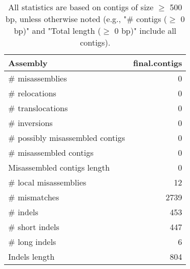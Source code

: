\documentclass[12pt,a4paper]{article}
\begin{document}
\begin{table}[ht]
\begin{center}
\caption{All statistics are based on contigs of size $\geq$ 500 bp, unless otherwise noted (e.g., "\# contigs ($\geq$ 0 bp)" and "Total length ($\geq$ 0 bp)" include all contigs).}
\begin{tabular}{|l*{1}{|r}|}
\hline
Assembly & final.contigs \\ \hline
\# misassemblies & 0 \\ \hline
\hspace{5mm}\# relocations & 0 \\ \hline
\hspace{5mm}\# translocations & 0 \\ \hline
\hspace{5mm}\# inversions & 0 \\ \hline
\# possibly misassembled contigs & 0 \\ \hline
\# misassembled contigs & 0 \\ \hline
Misassembled contigs length & 0 \\ \hline
\# local misassemblies & 12 \\ \hline
\# mismatches & 2739 \\ \hline
\# indels & 453 \\ \hline
\hspace{5mm}\# short indels & 447 \\ \hline
\hspace{5mm}\# long indels & 6 \\ \hline
Indels length & 804 \\ \hline
\end{tabular}
\end{center}
\end{table}
\end{document}
